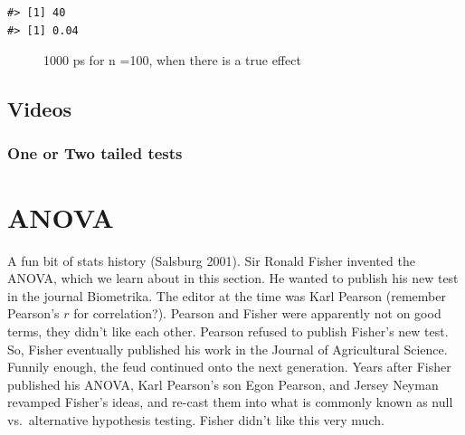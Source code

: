 \documentclass[
  letterpaper,
  DIV=11,
  numbers=noendperiod]{scrreprt}
\begin{document}
\begin{verbatim}
#> [1] 40
#> [1] 0.04
\end{verbatim}

\begin{figure}


\caption{\label{fig-7simpsC}1000 ps for n =100, when there is a true
effect}

\end{figure}%

\section{Videos}\label{videos-4}

\subsection{One or Two tailed tests}\label{one-or-two-tailed-tests}


\chapter{ANOVA}\label{anova}

A fun bit of stats history (Salsburg 2001). Sir Ronald Fisher invented
the ANOVA, which we learn about in this section. He wanted to publish
his new test in the journal Biometrika. The editor at the time was Karl
Pearson (remember Pearson's \(r\) for correlation?). Pearson and Fisher
were apparently not on good terms, they didn't like each other. Pearson
refused to publish Fisher's new test. So, Fisher eventually published
his work in the Journal of Agricultural Science. Funnily enough, the
feud continued onto the next generation. Years after Fisher published
his ANOVA, Karl Pearson's son Egon Pearson, and Jersey Neyman revamped
Fisher's ideas, and re-cast them into what is commonly known as null
vs.~alternative hypothesis testing. Fisher didn't like this very much.
\end{document}
